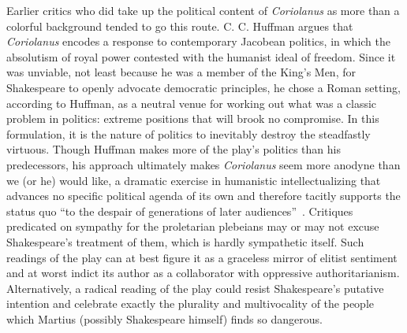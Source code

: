 Earlier critics who did take up the political content of \emph{Coriolanus} as more than a colorful background tended to go this route.
C. C. Huffman argues that \emph{Coriolanus} encodes a response to contemporary Jacobean politics, in which the absolutism of royal power contested with the humanist ideal of freedom.
Since it was unviable, not least because he was a member of the King's Men, for Shakespeare to openly advocate democratic principles, he chose a Roman setting, according to Huffman, as a neutral venue for working out what was a classic problem in politics: extreme positions that will brook no compromise.
In this formulation, it is the nature of politics to inevitably destroy the steadfastly virtuous.
Though Huffman makes more of the play's politics than his predecessors, his approach ultimately makes \emph{Coriolanus} seem more anodyne than we (or he) would like, a dramatic exercise in humanistic intellectualizing that advances no specific political agenda of its own and therefore tacitly supports the status quo ``to the despair of generations of later audiences''~\cite[222]{huffman_coriolanus_1972}.
Critiques predicated on sympathy for the proletarian plebeians may or may not excuse Shakespeare's treatment of them, which is hardly sympathetic itself.
Such readings of the play can at best figure it as a graceless mirror of elitist sentiment and at worst indict its author as a collaborator with oppressive authoritarianism.
Alternatively, a radical reading of the play could resist Shakespeare's putative intention and celebrate exactly the plurality and multivocality of the people which Martius (possibly Shakespeare himself) finds so dangerous.

